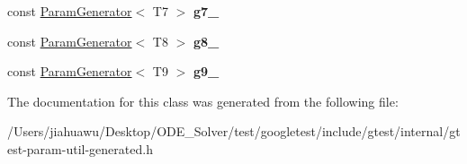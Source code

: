 \begin{DoxyCompactItemize}
const \mbox{\hyperlink{classtesting_1_1internal_1_1_param_generator}{Param\+Generator}}$<$ T7 $>$ {\bfseries g7\+\_\+}
\item 
\mbox{\label{classtesting_1_1internal_1_1_cartesian_product_generator9_aaf57427b6fe72dc8d49d85d315baf414}} 
const \mbox{\hyperlink{classtesting_1_1internal_1_1_param_generator}{Param\+Generator}}$<$ T8 $>$ {\bfseries g8\+\_\+}
\item 
\mbox{\label{classtesting_1_1internal_1_1_cartesian_product_generator9_a6d4e5519d1051143b283a2ddbd0d58ec}} 
const \mbox{\hyperlink{classtesting_1_1internal_1_1_param_generator}{Param\+Generator}}$<$ T9 $>$ {\bfseries g9\+\_\+}
\end{DoxyCompactItemize}


The documentation for this class was generated from the following file\+:\begin{DoxyCompactItemize}
\item 
/\+Users/jiahuawu/\+Desktop/\+O\+D\+E\+\_\+\+Solver/test/googletest/include/gtest/internal/gtest-\/param-\/util-\/generated.\+h\end{DoxyCompactItemize}
